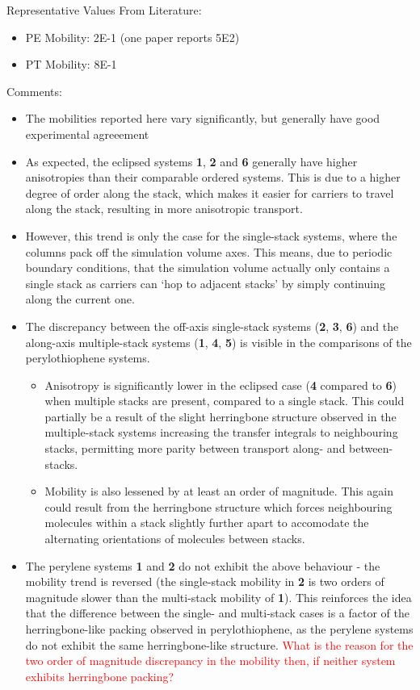 \documentclass[12pt]{article}
\begin{document}
Representative Values From Literature:
\begin{itemize}
    \item{PE Mobility: 2E-1 (one paper reports 5E2)}
    \item{PT Mobility: 8E-1}
\end{itemize}

Comments:
\begin{itemize}
    \item{The mobilities reported here vary significantly, but generally have good experimental agreeement}
    \item{As expected, the eclipsed systems \textbf{1}, \textbf{2} and \textbf{6} generally have higher anisotropies than their comparable ordered systems.
        This is due to a higher degree of order along the stack, which makes it easier for carriers to travel along the stack, resulting in more anisotropic transport.}
    \item{However, this trend is only the case for the single-stack systems, where the columns pack off the simulation volume axes.
        This means, due to periodic boundary conditions, that the simulation volume actually only contains a single stack as carriers can `hop to adjacent stacks' by simply continuing along the current one.}
    \item{The discrepancy between the off-axis single-stack systems (\textbf{2}, \textbf{3}, \textbf{6}) and the along-axis multiple-stack systems (\textbf{1}, \textbf{4}, \textbf{5}) is visible in the comparisons of the perylothiophene systems.
            \begin{itemize}
                \item{Anisotropy is significantly lower in the eclipsed case (\textbf{4} compared to \textbf{6}) when multiple stacks are present, compared to a single stack.
                    This could partially be a result of the slight herringbone structure observed in the multiple-stack systems increasing the transfer integrals to neighbouring stacks, permitting more parity between transport along- and between-stacks.}
                \item{Mobility is also lessened by at least an order of magnitude.
                    This again could result from the herringbone structure which forces neighbouring molecules within a stack slightly further apart to accomodate the alternating orientations of molecules between stacks.}
            \end{itemize}
        }
    \item{The perylene systems \textbf{1} and \textbf{2} do not exhibit the above behaviour - the mobility trend is reversed (the single-stack mobility in \textbf{2} is two orders of magnitude slower than the multi-stack mobility of \textbf{1}).
            This reinforces the idea that the difference between the single- and multi-stack cases is a factor of the herringbone-like packing observed in perylothiophene, as the perylene systems do not exhibit the same herringbone-like structure.
        \textcolor{red}{What is the reason for the two order of magnitude discrepancy in the mobility then, if neither system exhibits herringbone packing?}}
\end{itemize}
\end{document}
